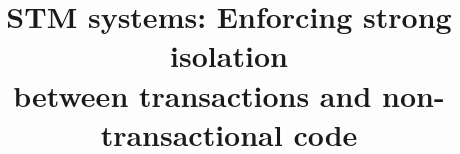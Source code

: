 \documentclass[11pt,letterpaper]{article}
\begin{document}
\newlength {\squarewidth}
\renewenvironment {square}
{
\setlength {\squarewidth} {\linewidth}
\addtolength {\squarewidth} {-12pt}
\renewcommand{\baselinestretch}{0.75} \footnotesize
\begin {center}
\begin {tabular} {|c|} \hline
\begin {minipage} {\squarewidth}
\medskip
}{
\end {minipage}
\\ \hline
\end{tabular}
\end{center}
}  
 
\newtheorem{definition}{Definition}
\newtheorem{theorem}{Theorem}
\newtheorem{lemma}{Lemma}
\newtheorem{corollary}{Corollary}
\newcommand{\toto}{xxx}
\newenvironment{proofT}{\noindent{\bf
Proof }} {\hspace*{\fill}$\Box_{Theorem~\ref{\toto}}$\par\vspace{3mm}}
\newenvironment{proofL}{\noindent{\bf
Proof }} {\hspace*{\fill}$\Box_{Lemma~\ref{\toto}}$\par\vspace{3mm}}
\newenvironment{proofC}{\noindent{\bf
Proof }} {\hspace*{\fill}$\Box_{Corollary~\ref{\toto}}$\par\vspace{3mm}}


\newcommand{\linenumbering}{\ifthenelse{\value{linecounter}<10}
{(0\arabic{linecounter})}{(\arabic{linecounter})}}
\renewcommand{\line}[1]{\refstepcounter{linecounter}\label{#1}\linenumbering}
\newcommand{\resetline}[1]{\setcounter{linecounter}{0}#1}
\renewcommand{\thelinecounter}{\ifnum \value{linecounter} > 
9\else 0\fi \arabic{linecounter}}

\newcommand{\tuple}[1]{\ensuremath{\left \langle #1 \right \rangle }}


\title{\bf STM systems: Enforcing strong isolation\\
           between transactions and non-transactional code}
\end{document}

